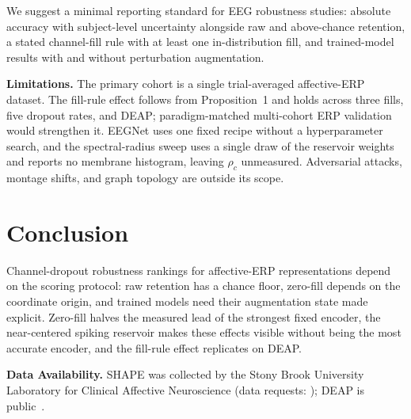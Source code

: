 \documentclass[conference]{IEEEtran}
\begin{document}
We suggest a minimal reporting standard for EEG robustness studies: absolute accuracy with subject-level uncertainty alongside raw and above-chance retention, a stated channel-fill rule with at least one in-distribution fill, and trained-model results with and without perturbation augmentation.

\textbf{Limitations.} The primary cohort is a single trial-averaged affective-ERP dataset. The fill-rule effect follows from Proposition~1 and holds across three fills, five dropout rates, and DEAP; paradigm-matched multi-cohort ERP validation would strengthen it. EEGNet uses one fixed recipe without a hyperparameter search, and the spectral-radius sweep uses a single draw of the reservoir weights and reports no membrane histogram, leaving $\rho_c$ unmeasured. Adversarial attacks, montage shifts, and graph topology are outside its scope.

\section{Conclusion}
Channel-dropout robustness rankings for affective-ERP representations depend on the scoring protocol: raw retention has a chance floor, zero-fill depends on the coordinate origin, and trained models need their augmentation state made explicit. Zero-fill halves the measured lead of the strongest fixed encoder, the near-centered spiking reservoir makes these effects visible without being the most accurate encoder, and the fill-rule effect replicates on DEAP.

\textbf{Data Availability.} SHAPE was collected by the Stony Brook University Laboratory for Clinical Affective Neuroscience (data requests: \cite{shape}); DEAP is public~\cite{koelstra2012deap}.
\end{document}

